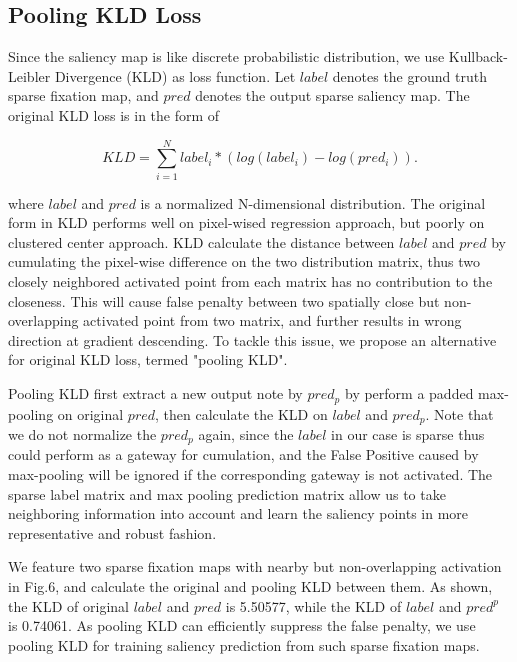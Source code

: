 \documentclass[letterpaper, 10 pt, conference]{ieeeconf}  %
\begin{document}
\subsection{Pooling KLD Loss}

\par Since the saliency map is like discrete probabilistic distribution, we use Kullback-Leibler Divergence (KLD) as loss function. Let $label$ denotes the ground truth sparse fixation map, and $pred$ denotes the output sparse saliency map. The original KLD loss is in the form of

\begin{equation}KLD=\sum_{i=1}^{N}label_{i}*(log(label_{i})-log(pred_{i})).\label{eq}\end{equation}

where $label$ and $pred$ is a normalized N-dimensional distribution. The original form in KLD performs well on pixel-wised regression approach, but poorly on clustered center approach. KLD calculate the distance between $label$ and $pred$ by cumulating the pixel-wise difference on the two distribution matrix, thus two closely neighbored activated point from each matrix has no contribution to the closeness. This will cause false penalty between two spatially close but non-overlapping activated point from two matrix, and further results in wrong direction at gradient descending. To tackle this issue, we propose an alternative for original KLD loss, termed "pooling KLD".

\par Pooling KLD first extract a new output note by $pred_{p}$ by perform a padded max-pooling on original $pred$, then calculate the KLD on $label$ and $pred_{p}$. Note that we do not normalize the $pred_{p}$ again, since the $label$ in our case is sparse thus could perform as a gateway for cumulation, and the False Positive caused by max-pooling will be ignored if the corresponding gateway is not activated. The sparse label matrix and max pooling prediction matrix allow us to take neighboring information into account and learn the saliency points in more representative and robust fashion.

\par We feature two sparse fixation maps with nearby but non-overlapping activation in Fig.6, and calculate the original and pooling KLD between them. As shown, the KLD of original $label$ and $pred$ is 5.50577, while the KLD of $label$ and $pred^{p}$ is 0.74061. As pooling KLD can efficiently suppress the false penalty, we use pooling KLD for training saliency prediction from such sparse fixation maps.
\end{document}

